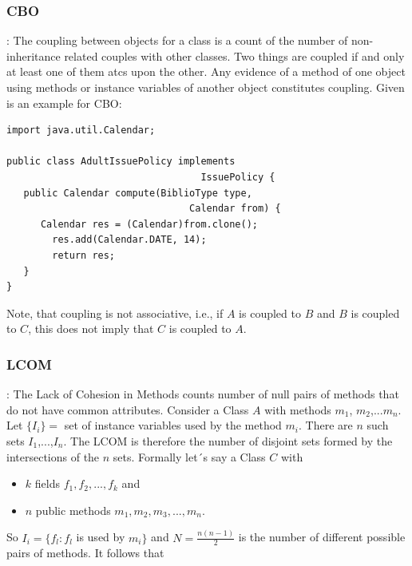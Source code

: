 \subsubsection{\textbf{CBO}}: The coupling between objects for a class is a count of the number of non-inheritance related couples with other classes. Two things are coupled if and only at least one of them atcs upon the other. Any evidence of a method of one object using methods or instance variables of another object constitutes coupling. Given is an example for CBO: 
\begin{small}
\begin{verbatim}
import java.util.Calendar;
	
public class AdultIssuePolicy implements
	                              IssuePolicy {
   public Calendar compute(BiblioType type, 
   								Calendar from) {
      Calendar res = (Calendar)from.clone();
        res.add(Calendar.DATE, 14);
        return res;
   }
}
\end{verbatim}
\end{small}

Note, that coupling is not associative, i.e., if $A$ is coupled to $B$ and $B$ is coupled to $C$, this does not imply that $C$ is coupled to $A$.


\subsubsection{\textbf{LCOM}}: The Lack of Cohesion in Methods counts number of null pairs of methods that do not have common attributes. Consider a Class $A$ with methods $m_1$, $m_2$,...$m_n$. Let $\{I_i\} =$ set of instance variables used by the method $m_i$. There are $n$ such sets $I_1$,...,$I_n$. The LCOM is therefore the number of disjoint sets formed by the intersections of the $n$ sets. Formally let´s say a Class $C$ with 
\begin{itemize}
	\item $k$ fields $f_1,f_2,...,f_k$ and
	\item $n$ public methods $m_1,m_2,m_3,...,m_n$.
\end{itemize} 
So $I_i= \{f_l:f_l$ is used by $m_i\}$ and $N=\frac{n(n-1)}{2}$ is the number of different possible pairs of methods. It follows that

